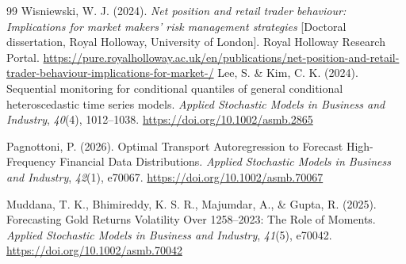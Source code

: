 \documentclass[11pt,a4paper]{article}
\begin{document}
\begin{thebibliography}{99}
 Wisniewski, W. J. (2024). \emph{Net position and retail trader behaviour: Implications for market makers' risk management strategies} [Doctoral dissertation, Royal Holloway, University of London]. Royal Holloway Research Portal. \url{https://pure.royalholloway.ac.uk/en/publications/net-position-and-retail-trader-behaviour-implications-for-market-/}
 Lee, S. \& Kim, C. K. (2024). Sequential monitoring for conditional quantiles of general conditional heteroscedastic time series models. \emph{Applied Stochastic Models in Business and Industry}, \emph{40}(4), 1012--1038. \url{https://doi.org/10.1002/asmb.2865}

 Pagnottoni, P. (2026). Optimal Transport Autoregression to Forecast High-Frequency Financial Data Distributions. \emph{Applied Stochastic Models in Business and Industry}, \emph{42}(1), e70067. \url{https://doi.org/10.1002/asmb.70067}

 Muddana, T. K., Bhimireddy, K. S. R., Majumdar, A., \& Gupta, R. (2025). Forecasting Gold Returns Volatility Over 1258--2023: The Role of Moments. \emph{Applied Stochastic Models in Business and Industry}, \emph{41}(5), e70042. \url{https://doi.org/10.1002/asmb.70042}
\end{thebibliography}
\end{document}
